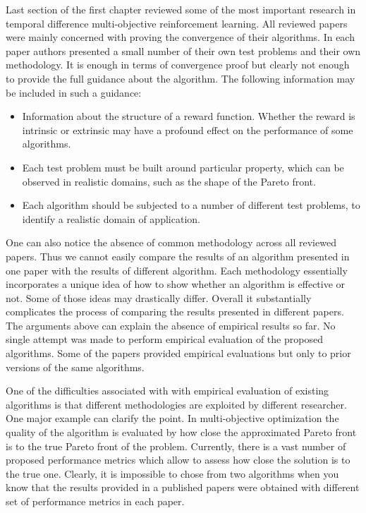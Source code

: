 Last section of the first chapter reviewed some of the most important research in temporal difference multi-objective reinforcement learning. All reviewed papers were mainly concerned with proving the convergence of their algorithms. In each paper authors presented a small number of their own test problems and their own methodology. It is enough in terms of convergence proof but clearly not enough to provide the full guidance about the algorithm. The following information may be included in such a guidance:
\begin{itemize}
  \item Information about the structure of a reward function. Whether the reward is intrinsic or extrinsic may have a profound effect on the performance of some algorithms.
  \item Each test problem must be built around particular property, which can be observed in realistic domains, such as the shape of the Pareto front.
  \item Each algorithm should be subjected to a number of different test problems, to identify a realistic domain of application.
\end{itemize}

One can also notice the absence of common methodology across all reviewed papers. Thus we cannot easily compare the results of an algorithm presented in one paper with the results of different algorithm. Each methodology essentially incorporates a unique idea of how to show whether an algorithm is effective or not. Some of those ideas may drastically differ. Overall it substantially complicates the process of comparing the results presented in different papers.\\

The arguments above can explain the absence of empirical results so far. No single attempt was made to perform empirical evaluation of the proposed algorithms. Some of the papers provided empirical evaluations but only to prior versions of the same algorithms.

One of the difficulties associated with with empirical evaluation of existing algorithms is that different methodologies are exploited by different researcher. One major example can clarify the point. In multi-objective optimization the quality of the algorithm is evaluated by how close the approximated Pareto front is to the true Pareto front of the problem. Currently, there is a vast number of proposed performance metrics which allow to assess how close the solution is to the true one. Clearly, it is impossible to chose from two algorithms when you know that the results provided in a published papers were obtained with different set of performance metrics in each paper. \\


